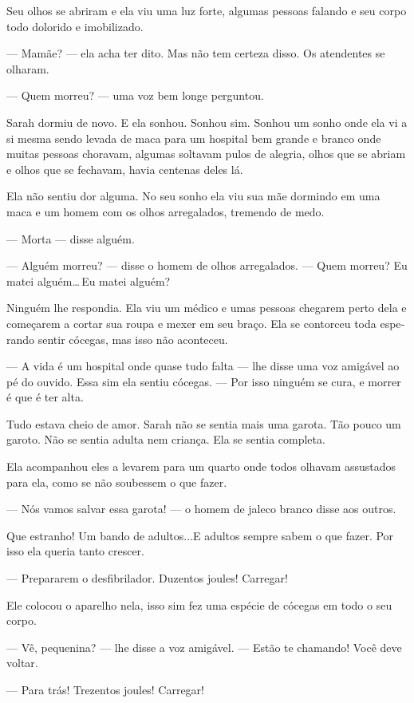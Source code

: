 Seu olhos se abriram e ela viu uma luz forte, algumas pessoas falando e seu corpo todo dolorido e imobilizado.

--- Mamãe? --- ela acha ter dito. Mas não tem certeza disso. Os atendentes se olharam.

--- Quem morreu? --- uma voz bem longe perguntou.

Sarah dormiu de novo. E ela sonhou. Sonhou sim. Sonhou um sonho onde ela vi a si mesma sendo levada de maca para um hospital bem grande e branco onde muitas pessoas choravam, algumas soltavam pulos de alegria,  olhos que se abriam e olhos que se fechavam, havia centenas deles lá.

Ela não sentiu dor alguma. No seu sonho ela viu sua mãe dormindo em uma maca e um homem com os olhos arregalados, tremendo de medo.

--- Morta --- disse alguém.

--- Alguém morreu? --- disse o homem de olhos arregalados. --- Quem morreu? Eu matei alguém\ldots\,Eu matei alguém?

Ninguém lhe respondia. Ela viu um médico e umas pessoas chegarem perto dela e começarem a cortar sua roupa e mexer em seu braço. Ela se contorceu toda espe­rando sentir cócegas, mas isso não aconteceu.

--- A vida é um hospital onde quase tudo falta --- lhe disse uma voz amigável ao pé do ouvido. Essa sim ela sentiu cócegas. --- Por isso ninguém se cura, e morrer é que é ter alta.

Tudo estava cheio de amor. Sarah não se sentia mais uma garota. Tão pouco um garoto.  Não se sentia adulta nem criança. Ela se sentia completa.

Ela acompanhou eles a levarem para um quarto onde todos olhavam assustados para ela, como se não soubessem o que fazer.

--- Nós vamos salvar essa garota! --- o homem de jaleco branco disse aos outros.

Que estranho! Um bando de adultos...E adultos sempre sabem o que fazer. Por isso ela queria tanto crescer.

--- Prepararem o desfibrilador. Duzentos joules! Carregar!

Ele colocou o aparelho nela, isso sim fez uma espécie de cócegas em todo o seu corpo.

--- Vê, pequenina? --- lhe disse a voz amigável. --- Estão te chamando! Você deve voltar.

--- Para trás! Trezentos joules! Carregar!

